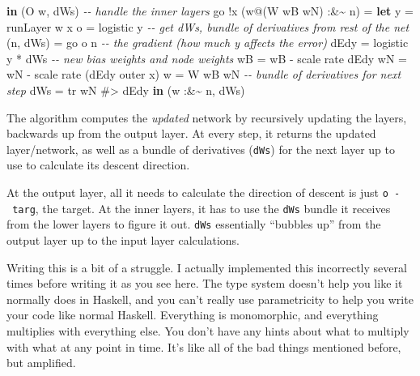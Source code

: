 \documentclass[]{article}
\newenvironment{Shaded}{}{}
\newcommand{\CommentTok}[1]{\textcolor[rgb]{0.38,0.63,0.69}{\textit{#1}}}
\newcommand{\DataTypeTok}[1]{\textcolor[rgb]{0.56,0.13,0.00}{#1}}
\newcommand{\KeywordTok}[1]{\textcolor[rgb]{0.00,0.44,0.13}{\textbf{#1}}}
\newcommand{\NormalTok}[1]{#1}
\newcommand{\OperatorTok}[1]{\textcolor[rgb]{0.40,0.40,0.40}{#1}}
\newcommand{\OtherTok}[1]{\textcolor[rgb]{0.00,0.44,0.13}{#1}}
\begin{document}
\begin{Shaded}
\begin{Highlighting}[]
          \KeywordTok{in}\NormalTok{  (}\DataTypeTok{O}\NormalTok{ w\textquotesingle{}, dWs)}
    \CommentTok{{-}{-} handle the inner layers}
\NormalTok{    go }\OperatorTok{!}\NormalTok{x (w}\OperatorTok{@}\NormalTok{(}\DataTypeTok{W}\NormalTok{ wB wN) }\OperatorTok{:\&\textasciitilde{}}\NormalTok{ n)}
        \OtherTok{=} \KeywordTok{let}\NormalTok{ y          }\OtherTok{=}\NormalTok{ runLayer w x}
\NormalTok{              o          }\OtherTok{=}\NormalTok{ logistic y}
              \CommentTok{{-}{-} get dWs\textquotesingle{}, bundle of derivatives from rest of the net}
\NormalTok{              (n\textquotesingle{}, dWs\textquotesingle{}) }\OtherTok{=}\NormalTok{ go o n}
              \CommentTok{{-}{-} the gradient (how much y affects the error)}
\NormalTok{              dEdy       }\OtherTok{=}\NormalTok{ logistic\textquotesingle{} y }\OperatorTok{*}\NormalTok{ dWs\textquotesingle{}}
              \CommentTok{{-}{-} new bias weights and node weights}
\NormalTok{              wB\textquotesingle{}  }\OtherTok{=}\NormalTok{ wB }\OperatorTok{{-}}\NormalTok{ scale rate dEdy}
\NormalTok{              wN\textquotesingle{}  }\OtherTok{=}\NormalTok{ wN }\OperatorTok{{-}}\NormalTok{ scale rate (dEdy }\OtherTok{\textasciigrave{}outer\textasciigrave{}}\NormalTok{ x)}
\NormalTok{              w\textquotesingle{}   }\OtherTok{=} \DataTypeTok{W}\NormalTok{ wB\textquotesingle{} wN\textquotesingle{}}
              \CommentTok{{-}{-} bundle of derivatives for next step}
\NormalTok{              dWs  }\OtherTok{=}\NormalTok{ tr wN }\OperatorTok{\#\textgreater{}}\NormalTok{ dEdy}
          \KeywordTok{in}\NormalTok{  (w\textquotesingle{} }\OperatorTok{:\&\textasciitilde{}}\NormalTok{ n\textquotesingle{}, dWs)}
\end{Highlighting}
\end{Shaded}

The algorithm computes the \emph{updated} network by recursively updating the
layers, backwards up from the output layer. At every step, it returns the
updated layer/network, as well as a bundle of derivatives (\texttt{dWs}) for the
next layer up to use to calculate its descent direction.

At the output layer, all it needs to calculate the direction of descent is just
\texttt{o\ -\ targ}, the target. At the inner layers, it has to use the
\texttt{dWs} bundle it receives from the lower layers to figure it out.
\texttt{dWs} essentially ``bubbles up'' from the output layer up to the input
layer calculations.

Writing this is a bit of a struggle. I actually implemented this incorrectly
several times before writing it as you see here. The type system doesn't help
you like it normally does in Haskell, and you can't really use parametricity to
help you write your code like normal Haskell. Everything is monomorphic, and
everything multiplies with everything else. You don't have any hints about what
to multiply with what at any point in time. It's like all of the bad things
mentioned before, but amplified.
\end{document}
